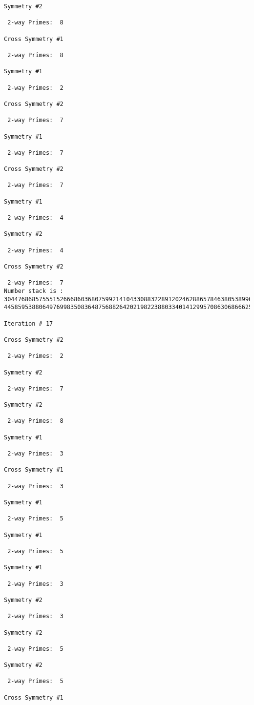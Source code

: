 \begin{verbatim}
Symmetry #2

 2-way Primes: 	8

Cross Symmetry #1

 2-way Primes: 	8

Symmetry #1

 2-way Primes: 	2

Cross Symmetry #2

 2-way Primes: 	7

Symmetry #1

 2-way Primes: 	7

Cross Symmetry #2

 2-way Primes: 	7

Symmetry #1

 2-way Primes: 	4

Symmetry #2

 2-way Primes: 	4

Cross Symmetry #2

 2-way Primes: 	7
Number stack is :
30447686857555152666860368075992141043308832289120246288657846380538996794608835958544046240163340857
44585953880649769983508364875688264202198223880334014129957086306866625155575868674403758043361042640

Iteration #	17

Cross Symmetry #2

 2-way Primes: 	2

Symmetry #2

 2-way Primes: 	7

Symmetry #2

 2-way Primes: 	8

Symmetry #1

 2-way Primes: 	3

Cross Symmetry #1

 2-way Primes: 	3

Symmetry #1

 2-way Primes: 	5

Symmetry #1

 2-way Primes: 	5

Symmetry #1

 2-way Primes: 	3

Symmetry #2

 2-way Primes: 	3

Symmetry #2

 2-way Primes: 	5

Symmetry #2

 2-way Primes: 	5

Cross Symmetry #1


\end{verbatim}

